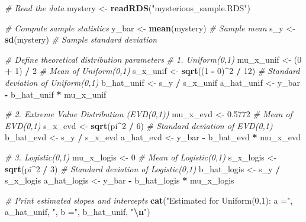 \documentclass[
]{article}
\newenvironment{Shaded}{\begin{snugshade}}{\end{snugshade}}
\newcommand{\CommentTok}[1]{\textcolor[rgb]{0.56,0.35,0.01}{\textit{#1}}}
\newcommand{\DecValTok}[1]{\textcolor[rgb]{0.00,0.00,0.81}{#1}}
\newcommand{\FloatTok}[1]{\textcolor[rgb]{0.00,0.00,0.81}{#1}}
\newcommand{\FunctionTok}[1]{\textcolor[rgb]{0.13,0.29,0.53}{\textbf{#1}}}
\newcommand{\NormalTok}[1]{#1}
\newcommand{\OtherTok}[1]{\textcolor[rgb]{0.56,0.35,0.01}{#1}}
\newcommand{\SpecialCharTok}[1]{\textcolor[rgb]{0.81,0.36,0.00}{\textbf{#1}}}
\newcommand{\StringTok}[1]{\textcolor[rgb]{0.31,0.60,0.02}{#1}}
\begin{document}
\begin{Shaded}
\begin{Highlighting}[]
\CommentTok{\# Read the data}
\NormalTok{mystery }\OtherTok{\textless{}{-}} \FunctionTok{readRDS}\NormalTok{(}\StringTok{"mysterious\_sample.RDS"}\NormalTok{)}

\CommentTok{\# Compute sample statistics}
\NormalTok{y\_bar }\OtherTok{\textless{}{-}} \FunctionTok{mean}\NormalTok{(mystery)  }\CommentTok{\# Sample mean}
\NormalTok{s\_y }\OtherTok{\textless{}{-}} \FunctionTok{sd}\NormalTok{(mystery)  }\CommentTok{\# Sample standard deviation}

\CommentTok{\# Define theoretical distribution parameters}
\CommentTok{\# 1. Uniform(0,1)}
\NormalTok{mu\_x\_unif }\OtherTok{\textless{}{-}}\NormalTok{ (}\DecValTok{0} \SpecialCharTok{+} \DecValTok{1}\NormalTok{) }\SpecialCharTok{/} \DecValTok{2}  \CommentTok{\# Mean of Uniform(0,1)}
\NormalTok{s\_x\_unif }\OtherTok{\textless{}{-}} \FunctionTok{sqrt}\NormalTok{((}\DecValTok{1} \SpecialCharTok{{-}} \DecValTok{0}\NormalTok{)}\SpecialCharTok{\^{}}\DecValTok{2} \SpecialCharTok{/} \DecValTok{12}\NormalTok{)  }\CommentTok{\# Standard deviation of Uniform(0,1)}
\NormalTok{b\_hat\_unif }\OtherTok{\textless{}{-}}\NormalTok{ s\_y }\SpecialCharTok{/}\NormalTok{ s\_x\_unif}
\NormalTok{a\_hat\_unif }\OtherTok{\textless{}{-}}\NormalTok{ y\_bar }\SpecialCharTok{{-}}\NormalTok{ b\_hat\_unif }\SpecialCharTok{*}\NormalTok{ mu\_x\_unif}

\CommentTok{\# 2. Extreme Value Distribution (EVD(0,1))}
\NormalTok{mu\_x\_evd }\OtherTok{\textless{}{-}} \FloatTok{0.5772}  \CommentTok{\# Mean of EVD(0,1)}
\NormalTok{s\_x\_evd }\OtherTok{\textless{}{-}} \FunctionTok{sqrt}\NormalTok{(pi}\SpecialCharTok{\^{}}\DecValTok{2} \SpecialCharTok{/} \DecValTok{6}\NormalTok{)  }\CommentTok{\# Standard deviation of EVD(0,1)}
\NormalTok{b\_hat\_evd }\OtherTok{\textless{}{-}}\NormalTok{ s\_y }\SpecialCharTok{/}\NormalTok{ s\_x\_evd}
\NormalTok{a\_hat\_evd }\OtherTok{\textless{}{-}}\NormalTok{ y\_bar }\SpecialCharTok{{-}}\NormalTok{ b\_hat\_evd }\SpecialCharTok{*}\NormalTok{ mu\_x\_evd}

\CommentTok{\# 3. Logistic(0,1)}
\NormalTok{mu\_x\_logis }\OtherTok{\textless{}{-}} \DecValTok{0}  \CommentTok{\# Mean of Logistic(0,1)}
\NormalTok{s\_x\_logis }\OtherTok{\textless{}{-}} \FunctionTok{sqrt}\NormalTok{(pi}\SpecialCharTok{\^{}}\DecValTok{2} \SpecialCharTok{/} \DecValTok{3}\NormalTok{)  }\CommentTok{\# Standard deviation of Logistic(0,1)}
\NormalTok{b\_hat\_logis }\OtherTok{\textless{}{-}}\NormalTok{ s\_y }\SpecialCharTok{/}\NormalTok{ s\_x\_logis}
\NormalTok{a\_hat\_logis }\OtherTok{\textless{}{-}}\NormalTok{ y\_bar }\SpecialCharTok{{-}}\NormalTok{ b\_hat\_logis }\SpecialCharTok{*}\NormalTok{ mu\_x\_logis}

\CommentTok{\# Print estimated slopes and intercepts}
\FunctionTok{cat}\NormalTok{(}\StringTok{"Estimated for Uniform(0,1): a ="}\NormalTok{, a\_hat\_unif, }\StringTok{", b ="}\NormalTok{, b\_hat\_unif, }\StringTok{"}\SpecialCharTok{\textbackslash{}n}\StringTok{"}\NormalTok{)}
\end{Highlighting}
\end{Shaded}
\end{document}
